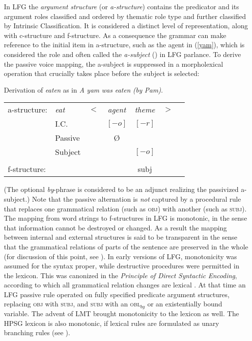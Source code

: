 In LFG the \textit{argument structure} (or \textit{a-structure}) contains the predicator and its argument roles classified and ordered by thematic role type and further classified by  Intrinsic Classification.  It is considered a distinct level of representation, along with c-structure and f-structure.  As a consequence the grammar can make reference to the initial item in a-structure, such as the agent
in (\ref{yam}), which is considered the  role and often called the \textit{a-subject} () in LFG parlance.  To derive the passive voice mapping, the a-subject is suppressed in a morpholexical operation that crucially takes place before the subject is selected:  

 \begin{exe}
\ex\label{yam2}{Derivation of \textit{eaten} as in \textit{A yam was eaten (by Pam)}.\\
\begin{tabular}[t]{@{}lllccll}
a-structure: &{\it eat}& $<$& \textit{agent} & \textit{theme}   & $>$ & \\
             & I.C.      &    & $[-o]$ & $[-r]$   &   & \\
             & Passive      &    & \O  &    &   & \\
             &  Subject     &    &  &       $[-o]$     &              & \\
             &       &    &    & \vline &    & \\
f-structure: &       &    & &{\sc subj} &   &
\end{tabular}
  }
\end{exe}
(The optional \textit{by}-phrase is considered to be an adjunct realizing the passivized a-subject.)  Note that the passive alternation is \textit{not} captured by a procedural rule that replaces one grammatical relation (such as \textsc{obj}) with another (such as \textsc{subj}).   The mapping from word strings to f-structures in LFG is monotonic, in the sense that information cannot be destroyed or changed.  As a result the mapping between internal and external structures is said to be transparent in the sense that the grammatical relations of parts of the sentence are preserved in the whole (for discussion of this point, see \citealt[Chapter 5]{BATW2016a}).  In early versions of LFG, monotonicity was assumed for the syntax proper, while destructive procedures were permitted in the lexicon.  This was canonized in the \textit{Principle of Direct Syntactic Encoding}, according to which all grammatical relation changes are lexical \citep{Bresnan82a-ed}.  At that time an LFG passive rule operated on fully specified predicate argument structures, replacing \textsc{obj} with \textsc{subj}, and \textsc{subj} with an \textsc{obl$_{by}$} or an existentially bound variable.  The advent of LMT brought monotonicity to the lexicon as well.  The HPSG lexicon is also monotonic, if lexical rules are formulated as unary branching rules (see ). 


